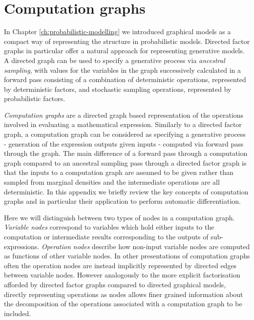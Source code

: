 \chapter{Computation graphs}\label{ch:computation-graphs}

In Chapter \ref{ch:probabilistic-modelling} we introduced graphical models as a compact way of representing the structure in probabilistic models. Directed factor graphs in particular offer a natural approach for representing generative models. A directed graph can be used to specify a generative process via \emph{ancestral sampling}, with values for the variables in the graph successively calculated in a forward pass consisting of a combination of deterministic operations, represented by deterministic factors, and stochastic sampling operations, represented by probabilistic factors. %

\emph{Computation graphs} \citep{bauer1974computational} are a directed graph based representation of the operations involved in evaluating a mathematical expression. Similarly to a directed factor graph, a computation graph can be considered as specifying a generative process - generation of the expression outputs  given inputs - computed via forward pass through the graph. The main difference of a forward pass through a computation graph compared to an ancestral sampling pass through a directed factor graph is that the inputs to a computation graph are assumed to be given rather than sampled from marginal densities and the intermediate operations are all deterministic. In this appendix we briefly review the key concepts of computation graphs and in particular their application to perform automatic differentiation. 

Here we will distinguish between two types of nodes in a computation graph. \emph{Variable nodes} correspond to variables which hold either inputs to the computation or intermediate results corresponding to the outputs of sub-expressions. \emph{Operation nodes} describe how non-input variable nodes are computed as functions of other variable nodes. In other presentations of computation graphs often the operation nodes are instead implicitly represented by directed edges between variable nodes. However analogously to the more explicit factorisation afforded by directed factor graphs compared to directed graphical models, directly representing operations as nodes allows finer grained information about the decomposition of the operations associated with a computation graph to be included.

